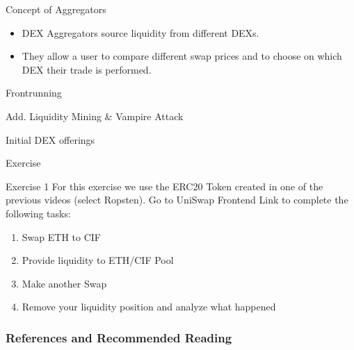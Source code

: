 \documentclass[]{beamer}
\begin{document}
\begin{frame}{Concept of Aggregators}

\begin{figure}
	\centering
	\resizebox{0.8\textwidth}{!}{
	\begin{tikzpicture}[scale=1.0, every node/.style={scale=1.0}]
			
	\end{tikzpicture}}
\end{figure}
	
\begin{itemize}
	\item DEX Aggregators source liquidity from different DEXs.
	\item They allow a user to compare different swap prices and to choose on which DEX their trade is performed.
\end{itemize}

\end{frame}


\begin{frame}{Frontrunning}

\end{frame}


\begin{frame}{Add. Liquidity Mining \& Vampire Attack}

\end{frame}


\begin{frame}{Initial DEX offerings}

\end{frame}


\begin{frame}{Exercise}
	\begin{exercise}{Exercise 1}
	For this exercise we use the ERC20 Token created in one of the previous videos (select Ropsten). Go to UniSwap Frontend Link to complete the following tasks:
	
		\begin{enumerate}
			\item Swap ETH to CIF
			\item Provide liquidity to ETH/CIF Pool
			\item Make another Swap
			\item Remove your liquidity position and analyze what happened
		\end{enumerate}
	\end{exercise}
\end{frame}



\begin{frame}%
\frametitle{References and Recommended Reading}
	
	
	
\end{frame}
\end{document}
